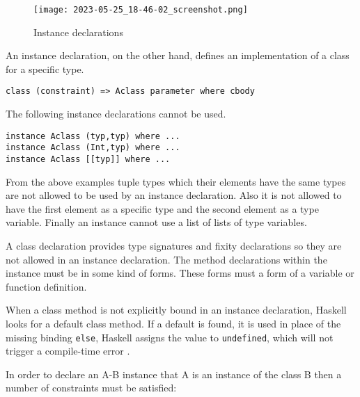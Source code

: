 \documentclass[a4paper, titlepage, twoside]{article}
\begin{document}
\begin{figure}[htbp]
\centering
\texttt{[image: 2023-05-25\_18-46-02\_screenshot.png]}
\caption{Instance declarations}
\end{figure}

An instance declaration, on the other hand, defines an implementation of a class for a specific type.

\begin{verbatim}
class (constraint) => Aclass parameter where cbody
\end{verbatim}

The following instance declarations cannot be used.

\begin{verbatim}
instance Aclass (typ,typ) where ...
instance Aclass (Int,typ) where ...
instance Aclass [[typ]] where ...
\end{verbatim}

From the above examples tuple types which their elements have the same types are not allowed to be used by an instance declaration. Also it is not allowed to have the first element as a specific type and the second element as a type variable. Finally an instance cannot use a list of lists of type variables.

A class declaration provides type signatures and fixity declarations so they are not allowed in an instance declaration. The method declarations within the instance must be in some kind of forms. These forms must a form of a variable or function definition.

When a class method is not explicitly bound in an instance declaration, Haskell looks for a default
class method. If a default is found, it is used in place of the missing binding \texttt{else}, Haskell assigns the
value to \texttt{undefined}, which will not trigger a compile-time error \autocite{marlowHaskell2010Language2010}.

In order to declare an A-B instance that A is an instance of the class B then a number of constraints must be satisfied:
\end{document}
